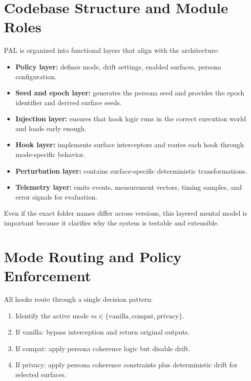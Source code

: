 \documentclass[11pt]{report}
\begin{document}
\section{Codebase Structure and Module Roles}

PAL is organized into functional layers that align with the architecture:

\begin{itemize}
    \item \textbf{Policy layer:} defines mode, drift settings, enabled surfaces, persona configuration.
    \item \textbf{Seed and epoch layer:} generates the persona seed and provides the epoch identifier and derived surface seeds.
    \item \textbf{Injection layer:} ensures that hook logic runs in the correct execution world and loads early enough.
    \item \textbf{Hook layer:} implements surface interceptors and routes each hook through mode-specific behavior.
    \item \textbf{Perturbation layer:} contains surface-specific deterministic transformations.
    \item \textbf{Telemetry layer:} emits events, measurement vectors, timing samples, and error signals for evaluation.
\end{itemize}

Even if the exact folder names differ across versions, this layered mental model is important because it clarifies why the system is testable and extensible.

\section{Mode Routing and Policy Enforcement}

All hooks route through a single decision pattern:

\begin{enumerate}
    \item Identify the active mode $m \in \{\text{vanilla},\text{compat},\text{privacy}\}$.
    \item If vanilla: bypass interception and return original outputs.
    \item If compat: apply persona coherence logic but disable drift.
    \item If privacy: apply persona coherence constraints plus deterministic drift for selected surfaces.
\end{enumerate}
\end{document}
